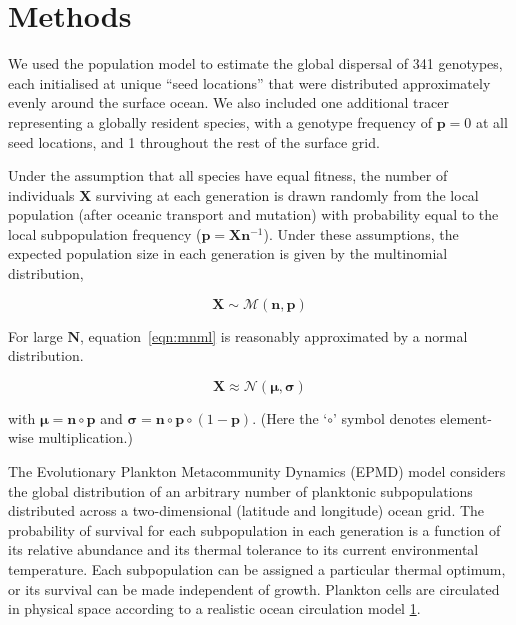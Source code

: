\documentclass[12pt]{article}
\begin{document}




\section{Methods}


We used the population model to estimate the global dispersal of 341 genotypes, each initialised at unique ``seed locations'' that were distributed approximately evenly around the surface ocean. We also included one additional tracer representing a globally resident species, with a genotype frequency of $\mathbf{p} = 0$ at all seed locations, and 1 throughout the rest of the surface grid.

Under the assumption that all species have equal fitness, the number of individuals $\mathbf{X}$ surviving at each generation is drawn randomly from the local population (after oceanic transport and mutation) with probability equal to the local subpopulation frequency ($\mathbf{p} = \mathbf{X} \mathbf{n}^{-1}$). Under these assumptions, the expected population size in each generation is given by the multinomial distribution, 

\begin{equation}
\label{eqn:mnml}
\mathbf{X}\sim\mathcal{M}(\mathbf{n},\mathbf{p})
\end{equation}

For large $\mathbf{N}$, equation~\ref{eqn:mnml} is reasonably approximated by a normal distribution.

\begin{equation}
\mathbf{X}\approx\mathcal{N}(\boldsymbol{\mu},\boldsymbol{\sigma})
\end{equation}

with $\boldsymbol{\mu}=\mathbf{n}\circ\mathbf{p}$ and $\boldsymbol{\sigma}=\mathbf{n}\circ\mathbf{p}\circ(1-\mathbf{p})$. (Here the `$\circ$' symbol denotes element-wise multiplication.)




The Evolutionary Plankton Metacommunity Dynamics (EPMD) model considers the global distribution of an arbitrary number of planktonic subpopulations distributed across a two-dimensional (latitude and longitude) ocean grid. The probability of survival for each subpopulation in each generation is a function of its relative abundance and its thermal tolerance to its current environmental temperature. Each subpopulation can be assigned a particular thermal optimum, or its survival can be made independent of growth. Plankton cells are circulated in physical space according to a realistic ocean circulation model \ref{}. 
\end{document}
